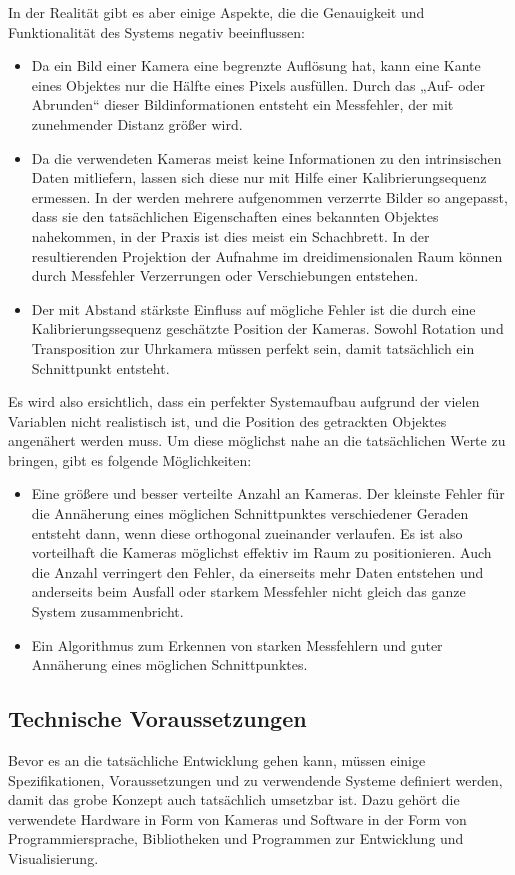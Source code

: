 \documentclass[12pt]{article}
\begin{document}
In der Realität gibt es aber einige Aspekte, die die Genauigkeit und Funktionalität des Systems negativ beeinflussen: 
\begin{itemize}
  \item Da ein Bild einer Kamera eine begrenzte Auflösung hat, kann eine Kante eines Objektes nur die Hälfte eines Pixels ausfüllen. Durch das „Auf- oder Abrunden“ dieser Bildinformationen entsteht ein Messfehler, der mit zunehmender Distanz größer wird. 
  \item Da die verwendeten Kameras meist keine Informationen zu den intrinsischen Daten mitliefern, lassen sich diese nur mit Hilfe einer Kalibrierungsequenz ermessen. In der werden mehrere aufgenommen verzerrte Bilder so angepasst, dass sie den tatsächlichen Eigenschaften eines bekannten Objektes nahekommen, in der Praxis ist dies meist ein Schachbrett. In der resultierenden Projektion der Aufnahme im dreidimensionalen Raum können durch Messfehler Verzerrungen oder Verschiebungen entstehen. 
  \item Der mit Abstand stärkste Einfluss auf mögliche Fehler ist die durch eine Kalibrierungssequenz geschätzte Position der Kameras. Sowohl Rotation und Transposition zur Uhrkamera müssen perfekt sein, damit tatsächlich ein Schnittpunkt entsteht. 
\end{itemize}

Es wird also ersichtlich, dass ein perfekter Systemaufbau aufgrund der vielen Variablen nicht realistisch ist, und die Position des getrackten Objektes angenähert werden muss. Um diese möglichst nahe an die tatsächlichen Werte zu bringen, gibt es folgende Möglichkeiten: 
\begin{itemize}
  \item Eine größere und besser verteilte Anzahl an Kameras. Der kleinste Fehler für die Annäherung eines möglichen Schnittpunktes verschiedener Geraden entsteht dann, wenn diese orthogonal zueinander verlaufen. Es ist also vorteilhaft die Kameras möglichst effektiv im Raum zu positionieren. Auch die Anzahl verringert den Fehler, da einerseits mehr Daten entstehen und anderseits beim Ausfall oder starkem Messfehler nicht gleich das ganze System zusammenbricht. 
  \item Ein Algorithmus zum Erkennen von starken Messfehlern und guter Annäherung eines möglichen Schnittpunktes. 
\end{itemize}

\newpage
\subsection{Technische Voraussetzungen}
Bevor es an die tatsächliche Entwicklung gehen kann, müssen einige Spezifikationen, Voraussetzungen und zu verwendende Systeme definiert werden, damit das grobe Konzept auch tatsächlich umsetzbar ist. Dazu gehört die verwendete Hardware in Form von Kameras und Software in der Form von Programmiersprache, Bibliotheken und Programmen zur Entwicklung und Visualisierung. 
\end{document}
